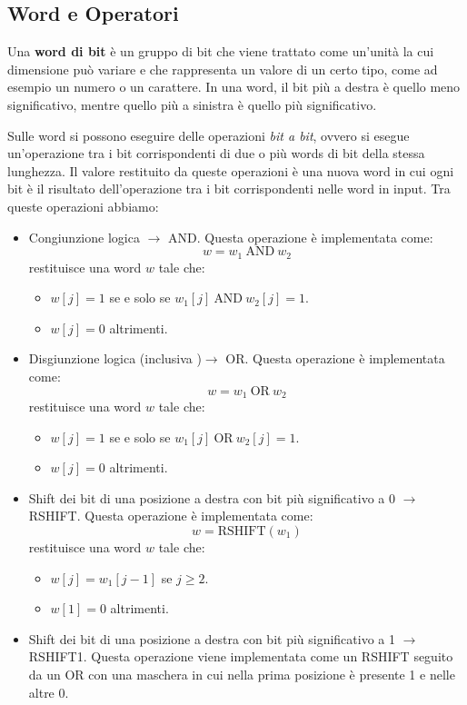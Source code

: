 \subsection{Word e Operatori}
\begin{definizione}
    Una \textbf{word di bit} è un gruppo di bit che viene trattato come un'unità la cui dimensione può variare e che rappresenta un valore di un certo tipo, come ad esempio un numero o un carattere. In una word, il bit più a destra è quello meno significativo, mentre quello più a sinistra è quello più significativo.
\end{definizione}
Sulle word si possono eseguire delle operazioni \textit{bit a bit}, ovvero si esegue un'operazione tra i bit corrispondenti di due o più words di bit della stessa lunghezza. Il valore restituito da queste operazioni è una nuova word in cui ogni bit è il risultato dell'operazione tra i bit corrispondenti nelle word in input. Tra queste operazioni abbiamo:
\begin{itemize}
    \item Congiunzione logica $\to$ AND. Questa operazione è implementata come:
    \begin{equation}
        w = w_1 \ \text{AND} \ w_2
    \end{equation}
    restituisce una word $w$ tale che:
    \begin{itemize}
        \item $w[j] = 1$ se e solo se $w_1[j] \ \text{AND} \ w_2[j] =  1$.
        \item $w[j] = 0$ altrimenti.
    \end{itemize}
    \item Disgiunzione logica (inclusiva )$\to$ OR. Questa operazione è implementata come:
    \begin{equation}
        w = w_1 \ \text{OR} \ w_2
    \end{equation}
    restituisce una word $w$ tale che:
    \begin{itemize}
        \item $w[j] = 1$ se e solo se $w_1[j] \ \text{OR} \ w_2[j] =  1$.
        \item $w[j] = 0$ altrimenti.
    \end{itemize}
    \item Shift dei bit di una posizione a destra con bit più significativo a 0 $\to$ RSHIFT. Questa operazione è implementata come:
    \begin{equation}
        w = \text{RSHIFT}(w_1)
    \end{equation}
    restituisce una word $w$ tale che:
    \begin{itemize}
        \item $w[j] = w_1[j - 1]$ se $j \geq 2$.
        \item $w[1] = 0$ altrimenti.
    \end{itemize}
    \item Shift dei bit di una posizione a destra con bit più significativo a 1 $\to$ RSHIFT1. Questa operazione viene implementata come un RSHIFT seguito da un OR con una maschera in cui nella prima posizione è presente 1 e nelle altre 0.
\end{itemize}
